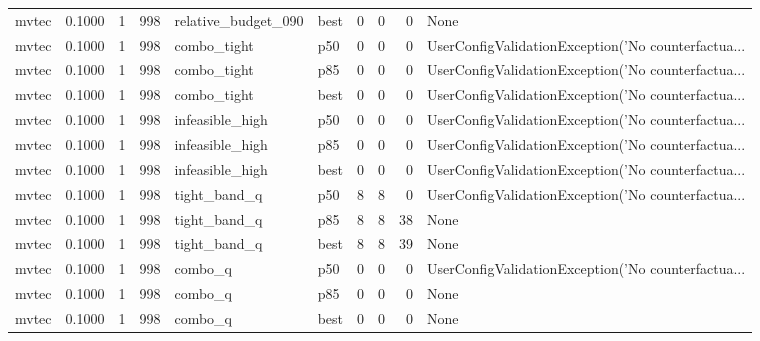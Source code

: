 \begin{tabular}{lrrrllrrrl}
   mvtec &    0.1000 &    1 &    998 &  relative\_budget\_090 &   best &               0 &          0 &       0 &                                               None \\
   mvtec &    0.1000 &    1 &    998 &          combo\_tight &    p50 &               0 &          0 &       0 & UserConfigValidationException('No counterfactua... \\
   mvtec &    0.1000 &    1 &    998 &          combo\_tight &    p85 &               0 &          0 &       0 & UserConfigValidationException('No counterfactua... \\
   mvtec &    0.1000 &    1 &    998 &          combo\_tight &   best &               0 &          0 &       0 & UserConfigValidationException('No counterfactua... \\
   mvtec &    0.1000 &    1 &    998 &      infeasible\_high &    p50 &               0 &          0 &       0 & UserConfigValidationException('No counterfactua... \\
   mvtec &    0.1000 &    1 &    998 &      infeasible\_high &    p85 &               0 &          0 &       0 & UserConfigValidationException('No counterfactua... \\
   mvtec &    0.1000 &    1 &    998 &      infeasible\_high &   best &               0 &          0 &       0 & UserConfigValidationException('No counterfactua... \\
   mvtec &    0.1000 &    1 &    998 &         tight\_band\_q &    p50 &               8 &          8 &       0 & UserConfigValidationException('No counterfactua... \\
   mvtec &    0.1000 &    1 &    998 &         tight\_band\_q &    p85 &               8 &          8 &      38 &                                               None \\
   mvtec &    0.1000 &    1 &    998 &         tight\_band\_q &   best &               8 &          8 &      39 &                                               None \\
   mvtec &    0.1000 &    1 &    998 &              combo\_q &    p50 &               0 &          0 &       0 & UserConfigValidationException('No counterfactua... \\
   mvtec &    0.1000 &    1 &    998 &              combo\_q &    p85 &               0 &          0 &       0 &                                               None \\
   mvtec &    0.1000 &    1 &    998 &              combo\_q &   best &               0 &          0 &       0 &                                               None \\

\end{tabular}
